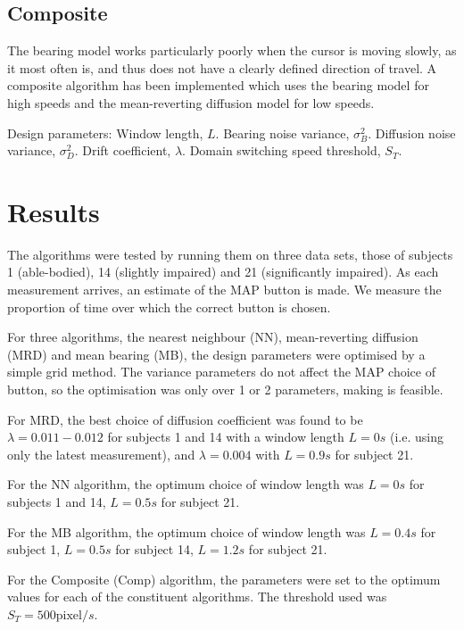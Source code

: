 \subsection{Composite}
The bearing model works particularly poorly when the cursor is moving slowly, as it most often is, and thus does not have a clearly defined direction of travel. A composite algorithm has been implemented which uses the bearing model for high speeds and the mean-reverting diffusion model for low speeds.

Design parameters: Window length, $L$. Bearing noise variance, $\sigma_B^2$. Diffusion noise variance, $\sigma_D^2$. Drift coefficient, $\lambda$. Domain switching speed threshold, $S_T$.



\section{Results}
The algorithms were tested by running them on three data sets, those of subjects 1 (able-bodied), 14 (slightly impaired) and 21 (significantly impaired). As each measurement arrives, an estimate of the MAP button is made. We measure the proportion of time over which the correct button is chosen.

For three algorithms, the nearest neighbour (NN), mean-reverting diffusion (MRD) and mean bearing (MB), the design parameters were optimised by a simple grid method. The variance parameters do not affect the MAP choice of button, so the optimisation was only over 1 or 2 parameters, making is feasible.

For MRD, the best choice of diffusion coefficient was found to be $\lambda = 0.011-0.012$ for subjects 1 and 14 with a window length $L=0s$ (i.e. using only the latest measurement), and $\lambda = 0.004$ with $L=0.9s$ for subject 21.

For the NN algorithm, the optimum choice of window length was $L=0s$ for subjects 1 and 14, $L=0.5s$ for subject 21.

For the MB algorithm, the optimum choice of window length was $L=0.4s$ for subject 1, $L=0.5s$ for subject 14, $L=1.2s$ for subject 21.

For the Composite (Comp) algorithm, the parameters were set to the optimum values for each of the constituent algorithms. The threshold used was $S_T = 500 \text{pixel}/s$.

\begin{table}[!hbt]
\caption{Table showing percentage of time for which each algorithm picks the correct button, with optimised parameters.}
\end{table}

